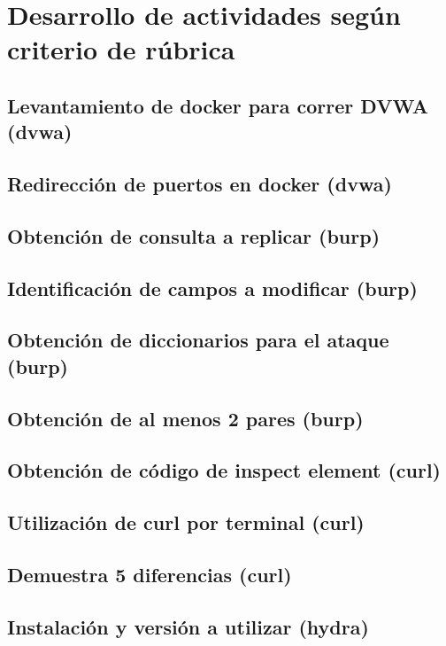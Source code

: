 \documentclass[letter,12pt]{article}
\begin{document}
\section{Desarrollo de actividades según criterio de rúbrica}

\subsection{Levantamiento de docker para correr DVWA (dvwa)}

\subsection{Redirección de puertos en docker (dvwa)}

\subsection{Obtención de consulta a replicar (burp)}

\subsection{Identificación de campos a modificar (burp)}

\subsection{Obtención de diccionarios para el ataque (burp)}

\subsection{Obtención de al menos 2 pares (burp)}

\subsection{Obtención de código de inspect element (curl)}

\subsection{Utilización de curl por terminal (curl)}

\subsection{Demuestra 5 diferencias (curl)}

\subsection{Instalación y versión a utilizar (hydra)}
\end{document}
